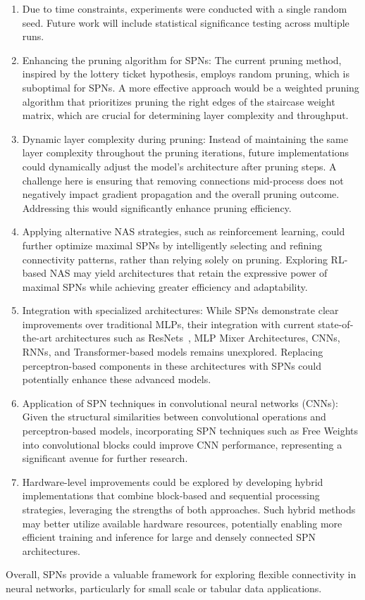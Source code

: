 \begin{enumerate}
    \item Due to time constraints, experiments were conducted with a single random seed. Future work will include statistical significance testing across multiple runs.
    \item Enhancing the pruning algorithm for SPNs: The current pruning method, inspired by the lottery ticket hypothesis, employs random pruning, which is suboptimal for SPNs. A more effective approach would be a weighted pruning algorithm that prioritizes pruning the right edges of the staircase weight matrix, which are crucial for determining layer complexity and throughput.    
    \item Dynamic layer complexity during pruning: Instead of maintaining the same layer complexity throughout the pruning iterations, future implementations could dynamically adjust the model's architecture after pruning steps. A challenge here is ensuring that removing connections mid-process does not negatively impact gradient propagation and the overall pruning outcome. Addressing this would significantly enhance pruning efficiency.
    \item Applying alternative NAS strategies, such as reinforcement learning, could further optimize maximal SPNs by intelligently selecting and refining connectivity patterns, rather than relying solely on pruning. Exploring RL-based NAS may yield architectures that retain the expressive power of maximal SPNs while achieving greater efficiency and adaptability.
    \item Integration with specialized architectures: While SPNs demonstrate clear improvements over traditional MLPs, their integration with current state-of-the-art architectures such as ResNets~\cite{he2016deep}, MLP Mixer Architectures\cite{tolstikhin2021mlp}, CNNs\cite{krizhevsky2012imagenet}, RNNs\cite{lipton2015critical}, and Transformer-based models\cite{vaswani2017attention} remains unexplored. Replacing perceptron-based components in these architectures with SPNs could potentially enhance these advanced models.
    \item Application of SPN techniques in convolutional neural networks (CNNs): Given the structural similarities between convolutional operations and perceptron-based models, incorporating SPN techniques such as Free Weights into convolutional blocks could improve CNN performance, representing a significant avenue for further research.
    \item Hardware-level improvements could be explored by developing hybrid implementations that combine block-based and sequential processing strategies, leveraging the strengths of both approaches. Such hybrid methods may better utilize available hardware resources, potentially enabling more efficient training and inference for large and densely connected SPN architectures.
\end{enumerate}

Overall, SPNs provide a valuable framework for exploring flexible connectivity in neural networks, particularly for small scale or tabular data applications.